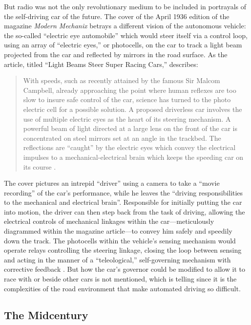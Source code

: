 But radio was not the only revolutionary medium to be included in
 portrayals of the self-driving car of the future. The cover of the
 April 1936\cite{???} edition of the magazine \emph{Modern Mechanix} betrays a
 different vision of the autonomous vehicle: the so-called ``electric
 eye automobile'' which would steer itself via a control loop, using an
 array of ``electric eyes,'' or photocells, on the car to track a light
 beam projected from the car and reflected by mirrors in the road
 surface. As the article, titled ``Light Beams Steer Super Racing
 Cars,'' describes:
\begin{quote}
With speeds, such as recently attained by the famous Sir Malcom
Campbell, already approaching the point where human reflexes are too
slow to insure safe control of the car, science has turned to the
photo electric cell for a possible solution. A proposed driverless car
involves the use of multiple electric eyes as the heart of its
steering mechanism. A powerful beam of light directed at a large lens
on the front of the car is concentrated on steel mirrors set at an
angle in the trackbed. The reflections are ``caught'' by the electric
eyes which convey the electrical impulses to a mechanical-electrical
brain which keeps the speeding car on its course \cite{???}.
\end{quote}

The cover pictures an intrepid ``driver'' using a camera to take a
``movie recording'' of the car's performance, while he leaves the
``driving responsibilities to the mechanical and electrical brain''\cite{???}.
Responsible for initially putting the car into motion, the driver can
then step back from the task of driving, allowing the electrical
controls of mechanical linkages within the car---meticulously diagrammed
within the magazine article---to convey him safely and speedily down
the track. The photocells within the vehicle's sensing mechanism would
operate relays controlling the steering linkage, closing the loop
between sensing and acting in the manner of a ``teleological,''
self-governing mechanism with corrective feedback \cite{???}. But how
the car's governor could be modified to allow it to race with or
beside other cars is not mentioned, which is telling since it is the
complexities of the road environment that make automated driving so difficult.

\subsection{The Midcentury}


